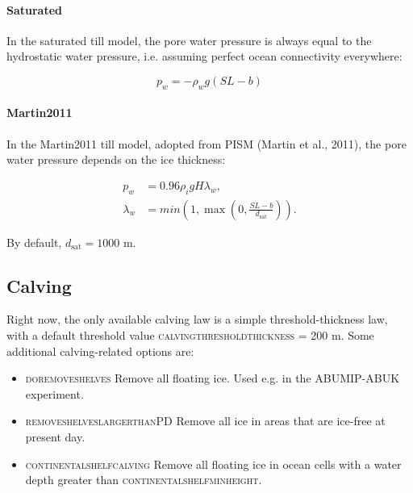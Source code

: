 \documentclass{article}
\begin{document}
\paragraph{Saturated}
In the saturated till model, the pore water pressure is always equal to the hydrostatic water pressure, i.e. assuming perfect ocean connectivity everywhere:

\begin{equation} \label{eq:slid_hydro_01}
p_w = -\rho_w g \left( SL - b \right)
\end{equation}

\paragraph{Martin2011}
In the Martin2011 till model, adopted from PISM (Martin et al., 2011), the pore water pressure depends on the ice thickness:

\begin{align} \label{eq:slid_hydro_02}
p_w &= 0.96 \rho_i g H \lambda_w, \\
\lambda_w &= min \left( 1, \max \left( 0, \frac{SL - b}{d_{\textrm{sat}} } \right) \right).
\end{align}

By default, $d_{\textrm{sat}} = 1000$ m.

\subsection{Calving}

Right now, the only available calving law is a simple threshold-thickness law, with a default threshold value \textsc{calving\textunderscore threshold\textunderscore thickness} = 200 m. Some additional calving-related options are:

\begin{itemize}
\item \textsc{do\textunderscore remove\textunderscore shelves} Remove all floating ice. Used e.g. in the ABUMIP-ABUK experiment.
\item \textsc{remove\textunderscore shelves\textunderscore larger\textunderscore than\textunderscore PD} Remove all ice in areas that are ice-free at present day.
\item \textsc{continental\textunderscore shelf\textunderscore calving} Remove all floating ice in ocean cells with a water depth greater than \textsc{continental\textunderscore shelf\textunderscore min\textunderscore height}.
\end{itemize}
\end{document}
